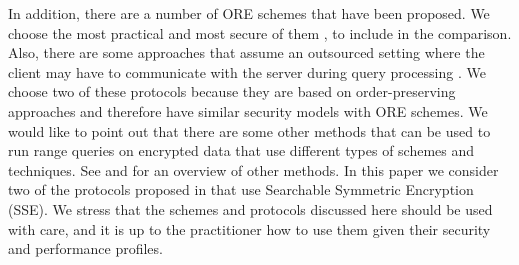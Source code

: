 		In addition, there are a number of ORE schemes \cite{ore-original, clww-ore, lewi-wu-ore, parameter-hiding-ore, parameter-hiding-ore, ore-learning, ore-partial, ore-multi-client} that have been proposed. %
		We choose the most practical and most secure of them \cite{clww-ore, lewi-wu-ore, parameter-hiding-ore}, to include in the comparison. %
		Also, there are some approaches that assume an outsourced setting where the client may have to communicate with the server during query processing \cite{pope, florian-protocol, secure-queries-overview, practical-range-search}.
		We choose two of these protocols \cite{pope, florian-protocol} because they are based on order-preserving approaches and therefore have similar security models with ORE schemes.
		We would like to point out that there are some other methods that can be used to run range queries on encrypted data that use different types of schemes and techniques.
		See \cite{secure-queries-overview} and \cite{protocols-survey} for an overview of other methods. %
		In this paper we consider two of the protocols proposed in \cite{practical-range-search} that use Searchable Symmetric Encryption (SSE).
		We stress that the schemes and protocols discussed here should be used with care, and it is up to the practitioner how to use them given their security and performance profiles.
